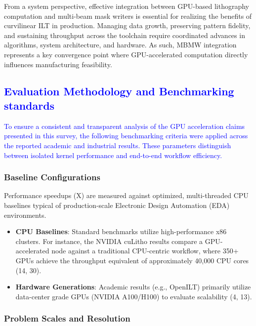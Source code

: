 \documentclass[pdflatex,sn-mathphys-num]{sn-jnl}%
\theoremstyle{thmstyleone}%
\theoremstyle{thmstyletwo}%
\theoremstyle{thmstylethree}%
\begin{document}
From a system perspective, effective integration between GPU-based lithography computation and multi-beam mask writers is essential for realizing the benefits of curvilinear ILT in production. Managing data growth, preserving pattern fidelity, and sustaining throughput across the toolchain require coordinated advances in algorithms, system architecture, and hardware. As such, MBMW integration represents a key convergence point where GPU-accelerated computation directly influences manufacturing feasibility.


\textcolor{blue}{\subsection{Evaluation Methodology and Benchmarking standards}}
\textcolor{blue}{
To ensure a consistent and transparent analysis of the GPU acceleration claims presented in this survey, the following benchmarking criteria were applied across the reported academic and industrial results. These parameters distinguish between isolated kernel performance and end-to-end workflow efficiency.}

\subsubsection{Baseline Configurations}
Performance speedups (X) are measured against optimized, multi-threaded CPU baselines typical of production-scale Electronic Design Automation (EDA) environments.

\begin{itemize}
  \item \textbf{CPU Baselines}: Standard benchmarks utilize high-performance x86 clusters. For instance, the NVIDIA cuLitho results compare a GPU-accelerated node against a traditional CPU-centric workflow, where 350+ GPUs achieve the throughput equivalent of approximately 40,000 CPU cores (14, 30).
  \item \textbf{Hardware Generations}: Academic results (e.g., OpenILT) primarily utilize data-center grade GPUs (NVIDIA A100/H100) to evaluate scalability (4, 13).
 \end{itemize}

 \subsubsection{Problem Scales and Resolution}
\end{document}
